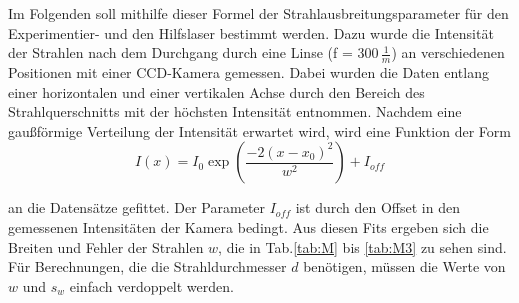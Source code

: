 Im Folgenden soll mithilfe dieser Formel der Strahlausbreitungsparameter für den Experimentier- und den Hilfslaser bestimmt werden. Dazu wurde die Intensität der Strahlen 
nach dem Durchgang durch eine Linse (f = 300\,$\frac{1}{m}$) an verschiedenen Positionen mit einer CCD-Kamera gemessen. Dabei wurden die Daten entlang einer horizontalen und 
einer vertikalen Achse durch den Bereich des Strahlquerschnitts mit der höchsten Intensität entnommen. Nachdem eine gaußförmige Verteilung der Intensität erwartet wird, wird 
eine Funktion der Form 
\begin{equation*}
    I(x) = I_0 \exp(\frac{-2(x-x_0)^2}{w^2}) + I_{off}
\end{equation*}

an die Datensätze gefittet. Der Parameter $I_{off}$ ist durch den Offset in den gemessenen Intensitäten der Kamera bedingt. Aus diesen Fits ergeben sich die Breiten und Fehler der 
Strahlen $w$, die in Tab.\ref{tab:M} bis \ref{tab:M3} zu sehen sind. Für Berechnungen, die die Strahldurchmesser $d$ benötigen, müssen die Werte von $w$ und $s_w$ einfach verdoppelt werden.

